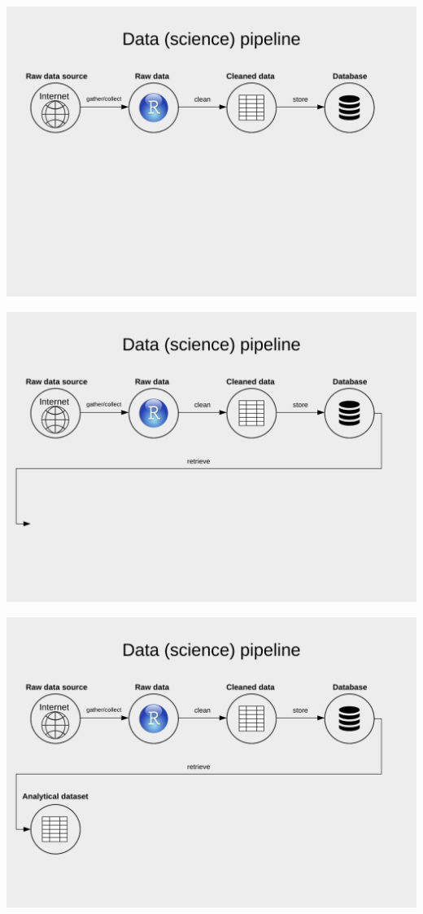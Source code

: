 \documentclass[
  ignorenonframetext,
]{beamer}
\begin{document}
\begin{frame}
\begin{center}\includegraphics[width=0.9\linewidth]{../../img/ds7} \end{center}
\end{frame}

\begin{frame}
\begin{center}\includegraphics[width=0.9\linewidth]{../../img/ds8} \end{center}
\end{frame}

\begin{frame}
\begin{center}\includegraphics[width=0.9\linewidth]{../../img/ds9} \end{center}
\end{frame}
\end{document}
